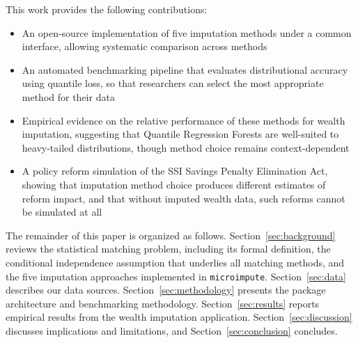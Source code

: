 This work provides the following contributions:
\begin{itemize}
    \item An open-source implementation of five imputation methods under a common interface, allowing systematic comparison across methods
    \item An automated benchmarking pipeline that evaluates distributional accuracy using quantile loss, so that researchers can select the most appropriate method for their data
    \item Empirical evidence on the relative performance of these methods for wealth imputation, suggesting that Quantile Regression Forests are well-suited to heavy-tailed distributions, though method choice remains context-dependent
    \item A policy reform simulation of the SSI Savings Penalty Elimination Act, showing that imputation method choice produces different estimates of reform impact, and that without imputed wealth data, such reforms cannot be simulated at all
\end{itemize}

The remainder of this paper is organized as follows. Section~\ref{sec:background} reviews the statistical matching problem, including its formal definition, the conditional independence assumption that underlies all matching methods, and the five imputation approaches implemented in \texttt{microimpute}. Section~\ref{sec:data} describes our data sources. Section~\ref{sec:methodology} presents the package architecture and benchmarking methodology. Section~\ref{sec:results} reports empirical results from the wealth imputation application. Section~\ref{sec:discussion} discusses implications and limitations, and Section~\ref{sec:conclusion} concludes.